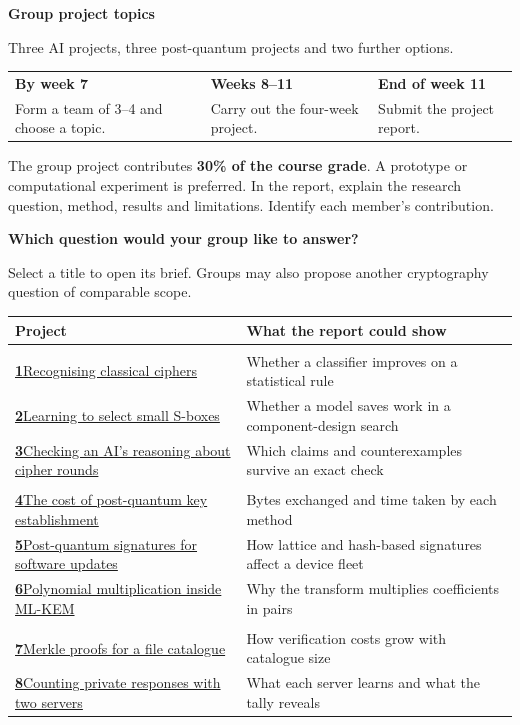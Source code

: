 \documentclass[12pt,a4paper]{article}
\makeatletter
\newcommand{\pagetitle}[1]{{\fontsize{27}{30}\selectfont\bfseries #1\par}\vspace{5pt}}
\newcommand{\spot}[3]{\hyperlink{topic#1}{\textbf{#1}\enspace #2} & #3\\}
\newcommand{\track}[1]{\multicolumn{2}{@{}l}{\textcolor{teal}{\bfseries #1}}\\}
\makeatother
\begin{document}
\pagetitle{Group project topics}
{\large Three AI projects, three post-quantum projects and two further options.\par}
\medskip
\begin{tabularx}{\linewidth}{@{}*{3}{>{\raggedright\arraybackslash}X}@{}}
\toprule
\textbf{By week 7} & \textbf{Weeks 8--11} & \textbf{End of week 11}\\
Form a team of 3--4 and choose a topic. & Carry out the four-week project. & Submit the project report.\\
\bottomrule
\end{tabularx}

The group project contributes \textbf{30\% of the course grade}. A prototype or computational experiment is preferred. In the report, explain the research question, method, results and limitations. Identify each member's contribution.

\vspace{5pt}
{\large\bfseries Which question would your group like to answer?\par}
{\small Select a title to open its brief. Groups may also propose another cryptography question of comparable scope.\par}
\begingroup
\renewcommand{\arraystretch}{1.36}
\begin{tabularx}{\linewidth}{@{}>{\raggedright\arraybackslash}p{.48\linewidth} >{\raggedright\arraybackslash}X@{}}
\toprule
\textbf{Project} & \textbf{What the report could show}\\
\midrule
\track{AI for cryptography}
\spot{1}{Recognising classical ciphers}{Whether a classifier improves on a statistical rule}
\spot{2}{Learning to select small S-boxes}{Whether a model saves work in a component-design search}
\spot{3}{Checking an AI's reasoning about cipher rounds}{Which claims and counterexamples survive an exact check}
\midrule
\track{Post-quantum cryptography}
\spot{4}{The cost of post-quantum key establishment}{Bytes exchanged and time taken by each method}
\spot{5}{Post-quantum signatures for software updates}{How lattice and hash-based signatures affect a device fleet}
\spot{6}{Polynomial multiplication inside ML-KEM}{Why the transform multiplies coefficients in pairs}
\midrule
\track{Hash functions and privacy}
\spot{7}{Merkle proofs for a file catalogue}{How verification costs grow with catalogue size}
\spot{8}{Counting private responses with two servers}{What each server learns and what the tally reveals}
\bottomrule
\end{tabularx}
\endgroup
\end{document}
